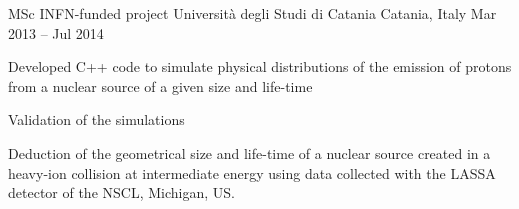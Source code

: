   \begin{cventries}
    \cventry
    {MSc INFN-funded project}
    {Università degli Studi di Catania}
    {Catania, Italy}
    {Mar 2013 -- Jul 2014}
    {
    \begin{cvitems}
      \item Developed C++ code to simulate physical distributions of the emission of protons from a nuclear source of a given size and life-time
      \item Validation of the simulations
      \item Deduction of the geometrical size and life-time of a nuclear source created in a heavy-ion collision at intermediate energy using data collected with the LASSA detector of the NSCL, Michigan, US.
    \end{cvitems}
    }
  \end{cventries}
